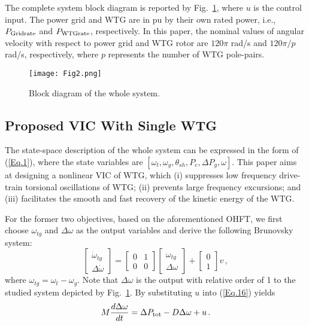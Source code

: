 \documentclass[journal]{IEEEtran}
\begin{document}
The complete system block diagram is reported by Fig.~\ref{Fig.2}, where $u$ is the control input. The power grid and WTG are in pu by their own rated power, i.e., $P_{\rm Gridrate}$ and $P_{\rm WTGrate}$, respectively. In this paper, the nominal values of angular velocity with respect to power grid and WTG rotor are $120\pi$ rad/s and $120 \pi/p$ rad/s, respectively, where $p$ represents the number of WTG pole-pairs.

\begin{figure}
  \centering
  \texttt{[image: Fig2.png]}
  \caption{Block diagram of the whole system.}
  \label{Fig.2}
\end{figure}

\subsection{Proposed VIC With Single WTG}

The state-space description of the whole system can be expressed in the form of (\ref{Eq.1}), where the state variables are $[\omega_t,\omega_g,\theta_{sh}, P_e, \Delta P_g, \omega]$.  This paper aims at designing a nonlinear VIC of WTG, which (i) suppresses low frequency drive-train torsional oscillations of WTG; (ii) prevents large frequency excursions; and (iii) facilitates the smooth and fast recovery of the kinetic energy of the WTG.

For the former two objectives, based on the aforementioned OHFT, we first choose $\omega_{tg}$ and $\Delta \omega$ as the output variables and derive the following Brunovsky system:
%
\begin{equation}
  \begin{bmatrix}
    \Dot{\omega}_{tg} \\
    \Delta \Dot{\omega}
  \end{bmatrix} =
  \begin{bmatrix}
    0&1\\0&0
  \end{bmatrix}
  \begin{bmatrix}
    \omega_{tg} \\
    \Delta \omega
  \end{bmatrix}+
  \begin{bmatrix}
    0\\1
  \end{bmatrix} v \, ,
  \label{Eq.19}
\end{equation}
%
where $\omega_{tg} = \omega_t-\omega_g$. Note that $\Delta \omega$ is the output with relative order of 1 to the studied system depicted by Fig.~\ref{Fig.2}. By substituting $u$ into (\ref{Eq.16}) yields
%
\begin{equation}
  M\frac{d \Delta \omega}{dt} = \Delta P_{\rm tot} - D\Delta \omega + u \, .
  \label{Eq.20}
\end{equation}
\end{document}

